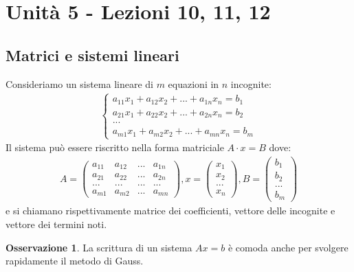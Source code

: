 \documentclass[a4paper]{article}
\theoremstyle{definition}
\newtheorem*{oss}{Osservazione}
\begin{document}
\section{Unità 5 - Lezioni 10, 11, 12}
\subsection{Matrici e sistemi lineari}
	Consideriamo un sistema lineare di $m$ equazioni in $n$ incognite:
	\begin{align*}
		\begin{cases}
			a_{11}x_1 + a_{12}x_2 + ... + a_{1n}x_n = b_1 \\
			a_{21}x_1 + a_{22}x_2 + ... + a_{2n}x_n = b_2 \\
			... \\
			a_{m1}x_1 + a_{m2}x_2 + ... + a_{mn}x_n = b_m
		\end{cases}
	\end{align*}
	Il sistema può essere riscritto nella forma matriciale $A \cdot x = B$ dove:
	\begin{align*}
		A = \begin{pmatrix}
			a_{11} & a_{12} & ... & a_{1n} \\
			a_{21} & a_{22} & ... & a_{2n} \\
			...    & ...    & ... & ...    \\
			a_{m1} & a_{m2} & ... & a_{mn}
		\end{pmatrix}, x = \begin{pmatrix}
			x_1 \\
			x_2 \\
			... \\
			x_n
		\end{pmatrix}, B = \begin{pmatrix}
			b_1 \\
			b_2 \\
			... \\
			b_m
		\end{pmatrix}
	\end{align*}
	e si chiamano rispettivamente matrice dei coefficienti, vettore delle incognite e vettore dei termini noti.
	\begin{oss}
		La scrittura di un sistema $Ax=b$ è comoda anche per svolgere rapidamente il metodo di Gauss.
	\end{oss}
\end{document}
